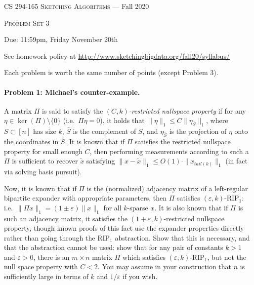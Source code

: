 \documentclass[12pt]{article}
\newcommand{\eps}{\varepsilon}
\begin{document}
\thispagestyle{empty}

\begin{center}
{\Large \textsc{CS 294-165 Sketching Algorithms} --- Fall 2020}

\bigskip

{\Large \textsc{Problem Set 3}}

\smallskip

Due: 11:59pm, Friday November 20th

\bigskip

{\footnotesize See homework policy at \url{http://www.sketchingbigdata.org/fall20/syllabus/}}

{\footnotesize Each problem is worth the same number of points (except Problem 3).}
\end{center}

\paragraph{Problem 1: Michael's counter-example.}
A matrix $\Pi$ is said to satisfy the {\it $(C,k)$-restricted nullspace property} if for any $\eta\in\ker(\Pi)\setminus\{0\}$ (i.e.\ $\Pi \eta = 0$), it holds that $\|\eta\|_1 \le C \|\eta_{\bar S}\|_1$, where $S\subset[n]$ has size $k$, $\bar S$ is the complement of $S$, and $\eta_{\bar S}$ is the projection of $\eta$ onto the coordinates in $\bar S$. It is known that if $\Pi$ satisfies the restricted nullspace property for small enough $C$, then performing measurements according to such a $\Pi$ is sufficient to recover $\tilde x$ satisfying $\|x - \tilde x\|_1 \le O(1)\cdot\|x_{tail(k)}\|_1$ (in fact via solving basis pursuit).

Now, it is known that if $\Pi$ is the (normalized) adjacency matrix of a left-regular bipartite expander with appropriate parameters, then $\Pi$ satisfies $(\eps,k)$-RIP$_1$: i.e.\ $\|\Pi x\|_1 = (1\pm\eps)\|x\|_1$ for all $k$-sparse $x$. It is also known that if $\Pi$ is such an adjacency matrix, it satisfies the $(1+\eps,k)$-restricted nullspace property, though known proofs of this fact use the expander properties directly rather than going through the RIP$_1$ abstraction. Show that this is necessary, and that the abstraction cannot be used: show that for any pair of constants $k > 1$ and $\eps > 0$, there is an $m\times n$ matrix $\Pi$ which satisfies $(\eps, k)$-RIP$_1$, but not the null space property with $C < 2$. You may assume in your construction that $n$ is sufficiently large in terms of $k$ and $1/\eps$ if you wish.
\end{document}
